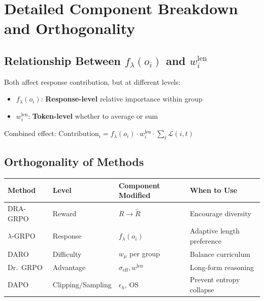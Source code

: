 \documentclass[11pt,a4paper]{article}
\begin{document}
\newpage


\section{Detailed Component Breakdown and Orthogonality}

\subsection{Relationship Between $f_\lambda(o_i)$ and $w_i^{\text{len}}$}

\begin{notebox}
Both affect response contribution, but at different levels:
\begin{itemize}
    \item $f_\lambda(o_i)$: \textbf{Response-level} relative importance within group
    \item $w_i^{\text{len}}$: \textbf{Token-level} whether to average or sum
\end{itemize}
Combined effect: $\text{Contribution}_i = f_\lambda(o_i) \cdot w_i^{\text{len}} \cdot \sum_t \mathcal{L}(i,t)$
\end{notebox}

\subsection{Orthogonality of Methods}

\begin{center}
\begin{tabular}{@{}llll@{}}
\toprule
\textbf{Method} & \textbf{Level} & \textbf{Component Modified} & \textbf{When to Use} \\
\midrule
DRA-GRPO & Reward & $R \to \tilde{R}$ & Encourage diversity \\
$\lambda$-GRPO & Response & $f_\lambda(o_i)$ & Adaptive length preference \\
DARO & Difficulty & $w_\mu$ per group & Balance curriculum \\
Dr.~GRPO & Advantage & $\sigma_{\text{eff}}, w^{\text{len}}$ & Long-form reasoning \\
DAPO & Clipping/Sampling & $\epsilon_h$, OS & Prevent entropy collapse \\
\bottomrule
\end{tabular}
\end{center}
\end{document}
